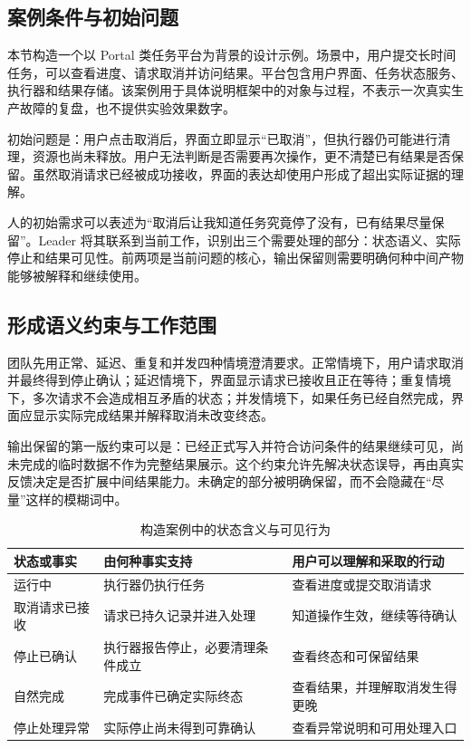 \label{sec:case}
\subsection{案例条件与初始问题}
本节构造一个以 Portal 类任务平台为背景的设计示例。场景中，用户提交长时间任务，可以查看进度、请求取消并访问结果。平台包含用户界面、任务状态服务、执行器和结果存储。该案例用于具体说明框架中的对象与过程，不表示一次真实生产故障的复盘，也不提供实验效果数字。

初始问题是：用户点击取消后，界面立即显示“已取消”，但执行器仍可能进行清理，资源也尚未释放。用户无法判断是否需要再次操作，更不清楚已有结果是否保留。虽然取消请求已经被成功接收，界面的表达却使用户形成了超出实际证据的理解。

人的初始需求可以表述为“取消后让我知道任务究竟停了没有，已有结果尽量保留”。Leader 将其联系到当前工作，识别出三个需要处理的部分：状态语义、实际停止和结果可见性。前两项是当前问题的核心，输出保留则需要明确何种中间产物能够被解释和继续使用。

\subsection{形成语义约束与工作范围}
团队先用正常、延迟、重复和并发四种情境澄清要求。正常情境下，用户请求取消并最终得到停止确认；延迟情境下，界面显示请求已接收且正在等待；重复情境下，多次请求不会造成相互矛盾的状态；并发情境下，如果任务已经自然完成，界面应显示实际完成结果并解释取消未改变终态。

输出保留的第一版约束可以是：已经正式写入并符合访问条件的结果继续可见，尚未完成的临时数据不作为完整结果展示。这个约束允许先解决状态误导，再由真实反馈决定是否扩展中间结果能力。未确定的部分被明确保留，而不会隐藏在“尽量”这样的模糊词中。

\begin{table}[htbp]\centering\small
\caption{构造案例中的状态含义与可见行为}\label{tab:states}
\begin{tabularx}{\linewidth}{p{2.5cm}YY}\toprule
状态或事实 & 由何种事实支持 & 用户可以理解和采取的行动\\\midrule
运行中 & 执行器仍执行任务 & 查看进度或提交取消请求\\
取消请求已接收 & 请求已持久记录并进入处理 & 知道操作生效，继续等待确认\\
停止已确认 & 执行器报告停止，必要清理条件成立 & 查看终态和可保留结果\\
自然完成 & 完成事件已确定实际终态 & 查看结果，并理解取消发生得更晚\\
停止处理异常 & 实际停止尚未得到可靠确认 & 查看异常说明和可用处理入口\\\bottomrule
\end{tabularx}\end{table}

